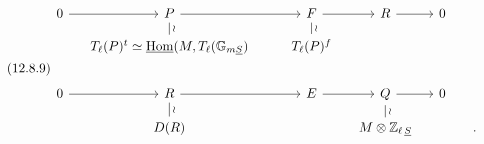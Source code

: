 \begin{equation}\tag{12.8.9}
\begin{tikzcd}[row sep=small, column sep=small]
0 \arrow[r] & P \arrow[rr] \arrow[d, dash, "\wr"] & & F \arrow[r] \arrow[d, dash, "\wr"] & R \arrow[r] & 0 & \\
& T_\ell(P)^t \simeq \underline{\mathrm{Hom}}(M,T_\ell(\mathbb{G}_{m\underline{S}}) & & T_\ell(P)^f & & & \\
& & & & & & \\
0 \arrow[r] & R \arrow[rr] \arrow[d, dash, "\wr"] & & E \arrow[r] & Q \arrow[r] \arrow[d, dash, "\wr"] & 0 & \\
& D(R) & & & M \otimes \mathbb{Z}_{\ell\,\underline{S}} & & .
\end{tikzcd}
\end{equation}

